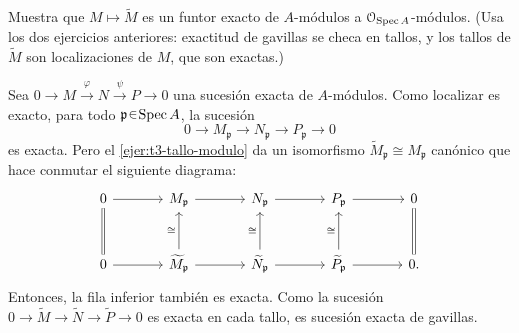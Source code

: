 \begin{ejer}\label{ejer:t3-funtor-modulo-exacto}
Muestra que $M\mapsto\widetilde M$ es un funtor exacto de $A$-módulos a $\mathcal O_{\operatorname{Spec} A}$-módulos. (Usa los dos ejercicios anteriores: exactitud de gavillas se checa en tallos, y los tallos de $\widetilde M$ son localizaciones de $M$, que son exactas.)
\end{ejer}
\begin{sol}
Sea $0\to M\xrightarrow{\varphi}N\xrightarrow{\psi}P\to0$ una sucesión exacta de $A$-módulos. Como localizar es exacto, para todo $\mathfrak p\en\Spec A$, la sucesión
\[
0\longrightarrow M_{\mathfrak p}\longrightarrow N_{\mathfrak p}\longrightarrow P_{\mathfrak p}\longrightarrow0
\]
es exacta. Pero el \cref{ejer:t3-tallo-modulo} da un isomorfismo $\widetilde M_{\mathfrak p}\cong M_{\mathfrak p}$ canónico que hace conmutar el siguiente diagrama:
\[
\begin{tikzcd}[column sep=large,row sep=large]
0\arrow[r]&M_{\mathfrak p}\arrow[r]&N_{\mathfrak p}\arrow[r]&P_{\mathfrak p}\arrow[r]&0\\
0\arrow[r]\arrow[u,equal]
&\widetilde M_{\mathfrak p}\arrow[r]\arrow[u,"\cong"]
&\widetilde N_{\mathfrak p}\arrow[r]\arrow[u,"\cong"]
&\widetilde P_{\mathfrak p}\arrow[r]\arrow[u,"\cong"]
&0\arrow[u,equal].
\end{tikzcd}
\]
Entonces, la fila inferior también es exacta. Como la sucesión $0\to\widetilde M\to\widetilde N\to\widetilde P\to0$ es exacta en cada tallo, es sucesión exacta de gavillas.
\end{sol}
